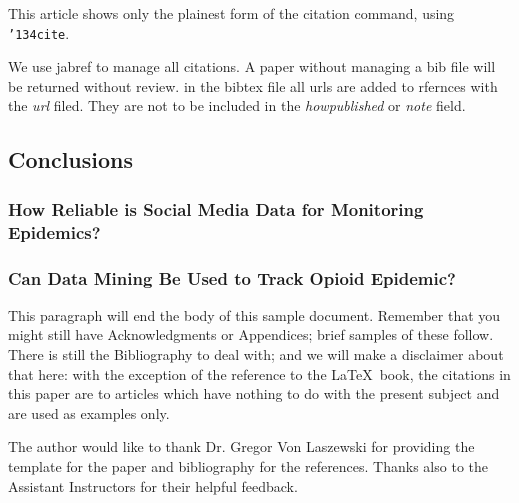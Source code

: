 \documentclass[sigconf]{acmart}
\begin{document}
This article shows only the plainest form of the citation command,
using \texttt{{\char'134}cite}.

We use jabref to manage all citations. A paper without managing a bib
file will be returned without review. in the bibtex file all urls are
added to rfernces with the {\it url} filed. They are not to be
included in the {\it howpublished} or {\it note} field. 


\subsection{Conclusions}


\subsubsection{How Reliable is Social Media Data for Monitoring Epidemics?}


\subsubsection{Can Data Mining Be Used to Track Opioid Epidemic?}


This paragraph will end the body of this sample document.  Remember
that you might still have Acknowledgments or Appendices; brief samples
of these follow.  There is still the Bibliography to deal with; and we
will make a disclaimer about that here: with the exception of the
reference to the \LaTeX\ book, the citations in this paper are to
articles which have nothing to do with the present subject and are
used as examples only.


\begin{acks}

  The author would like to thank Dr. Gregor Von Laszewski for providing the 
  \LaTex template for the paper and \JabRef bibliography for the references. 
  Thanks also to the Assistant Instructors for their helpful feedback.

\end{acks}


 
\end{document}

